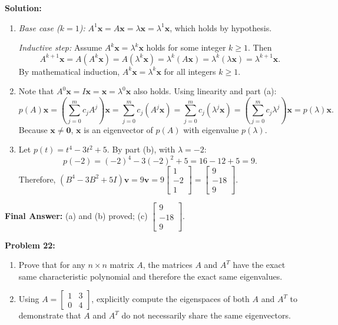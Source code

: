 \documentclass[11pt, letterpaper]{article}
\theoremstyle{definition}
\theoremstyle{remark}
\begin{document}
\textbf{Solution:}
\begin{enumerate}[label=(\alph*)]
    \item \emph{Base case ($k = 1$):} $A^1\mathbf{x} = A\mathbf{x} = \lambda\mathbf{x} = \lambda^1\mathbf{x}$, which holds by hypothesis.

    \emph{Inductive step:} Assume $A^k\mathbf{x} = \lambda^k\mathbf{x}$ holds for some integer $k \ge 1$. Then
    \[
    A^{k+1}\mathbf{x} = A(A^k\mathbf{x}) = A(\lambda^k\mathbf{x}) = \lambda^k(A\mathbf{x}) = \lambda^k(\lambda\mathbf{x}) = \lambda^{k+1}\mathbf{x}.
    \]
    By mathematical induction, $A^k\mathbf{x} = \lambda^k\mathbf{x}$ for all integers $k \ge 1$.

    \item Note that $A^0\mathbf{x} = I\mathbf{x} = \mathbf{x} = \lambda^0\mathbf{x}$ also holds. Using linearity and part (a):
    \[
    p(A)\mathbf{x} = \left(\sum_{j=0}^{m} c_j A^j\right)\mathbf{x} = \sum_{j=0}^{m} c_j (A^j \mathbf{x}) = \sum_{j=0}^{m} c_j (\lambda^j \mathbf{x}) = \left(\sum_{j=0}^{m} c_j \lambda^j\right)\mathbf{x} = p(\lambda)\mathbf{x}.
    \]
    Because $\mathbf{x} \neq \mathbf{0}$, $\mathbf{x}$ is an eigenvector of $p(A)$ with eigenvalue $p(\lambda)$.

    \item Let $p(t) = t^4 - 3t^2 + 5$. By part (b), with $\lambda = -2$:
    \[
    p(-2) = (-2)^4 - 3(-2)^2 + 5 = 16 - 12 + 5 = 9.
    \]
    Therefore, $(B^4 - 3B^2 + 5I)\mathbf{v} = 9\mathbf{v} = 9\begin{bmatrix} 1 \\ -2 \\ 1 \end{bmatrix} = \begin{bmatrix} 9 \\ -18 \\ 9 \end{bmatrix}$.
\end{enumerate}
\textbf{Final Answer:} (a) and (b) proved; (c) $\begin{bmatrix} 9 \\ -18 \\ 9 \end{bmatrix}$.

\vspace{0.4em}
\textbf{Problem 22:}
\begin{enumerate}[label=(\alph*)]
    \item Prove that for any $n \times n$ matrix $A$, the matrices $A$ and $A^T$ have the exact same characteristic polynomial and therefore the exact same eigenvalues.
    \item Using $A = \begin{bmatrix} 1 & 3 \\ 0 & 4 \end{bmatrix}$, explicitly compute the eigenspaces of both $A$ and $A^T$ to demonstrate that $A$ and $A^T$ do not necessarily share the same eigenvectors.
\end{enumerate}
\end{document}

